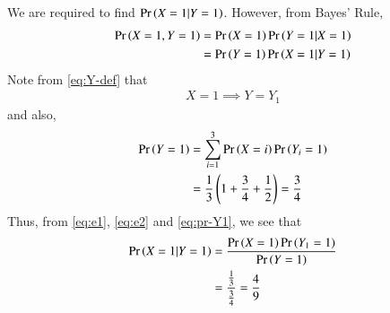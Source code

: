 \documentclass[journal,12pt,twocolumn]{IEEEtran}
\begin{document}
\begin{enumerate}
    We are required to find $\Pr\left(X=1|Y=1\right)$. However, from Bayes' Rule,
    \begin{align}
        \Pr\left(X=1,Y=1\right) &= \Pr\left(X=1\right)\Pr\left(Y=1|X=1\right) \label{eq:e1} \\
                       &= \Pr\left(Y=1\right)\Pr\left(X=1|Y=1\right) \label{eq:e2}
    \end{align}
    Note from \eqref{eq:Y-def} that
    \begin{align}
        X=1 \implies Y=Y_1
    \end{align}
    and also,
    \begin{align}
        \Pr\left(Y=1\right) &= \sum_{i=1}^3\Pr\left(X=i\right)\Pr\left(Y_i=1\right) \\
                 &= \frac{1}{3}\left(1+\frac{3}{4}+\frac{1}{2}\right) = \frac{3}{4}
                 \label{eq:pr-Y1}
    \end{align}
    Thus, from \eqref{eq:e1}, \eqref{eq:e2} and \eqref{eq:pr-Y1}, we see that
    \begin{align}
        \Pr\left(X=1|Y=1\right) &= \frac{\Pr\left(X=1\right)\Pr\left(Y_1=1\right)}{\Pr\left(Y=1\right)} \\
                     &= \frac{\frac{1}{3}}{\frac{3}{4}} = \frac{4}{9}
    \end{align}
\end{enumerate}
\end{document}
